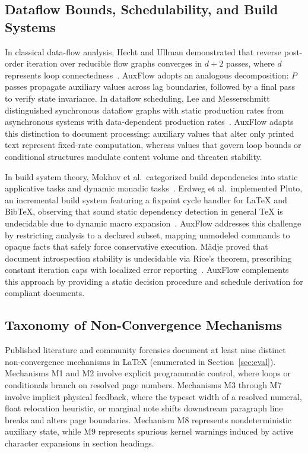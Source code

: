 \documentclass[conference]{IEEEtran}
\begin{document}
\subsection{Dataflow Bounds, Schedulability, and Build Systems}

In classical data-flow analysis, Hecht and Ullman demonstrated that reverse post-order iteration over reducible flow graphs converges in $d+2$ passes, where $d$ represents loop connectedness~\cite{hecht1975,kam1976}. AuxFlow adopts an analogous decomposition: $P$ passes propagate auxiliary values across lag boundaries, followed by a final pass to verify state invariance. In dataflow scheduling, Lee and Messerschmitt distinguished synchronous dataflow graphs with static production rates from asynchronous systems with data-dependent production rates~\cite{lee1987}. AuxFlow adapts this distinction to document processing: auxiliary values that alter only printed text represent fixed-rate computation, whereas values that govern loop bounds or conditional structures modulate content volume and threaten stability.

In build system theory, Mokhov et al.\ categorized build dependencies into static applicative tasks and dynamic monadic tasks~\cite{mokhov2018}. Erdweg et al.\ implemented Pluto, an incremental build system featuring a fixpoint cycle handler for \LaTeX{} and BibTeX, observing that sound static dependency detection in general \TeX{} is undecidable due to dynamic macro expansion~\cite{erdweg2015,erdweg2010}. AuxFlow addresses this challenge by restricting analysis to a declared subset, mapping unmodeled commands to opaque facts that safely force conservative execution. M\"adje proved that document introspection stability is undecidable via Rice's theorem, prescribing constant iteration caps with localized error reporting~\cite{madje2022}. AuxFlow complements this approach by providing a static decision procedure and schedule derivation for compliant documents.

\subsection{Taxonomy of Non-Convergence Mechanisms}

Published literature and community forensics document at least nine distinct non-convergence mechanisms in \LaTeX{} (enumerated in Section~\ref{sec:eval}). Mechanisms M1 and M2 involve explicit programmatic control, where loops or conditionals branch on resolved page numbers. Mechanisms M3 through M7 involve implicit physical feedback, where the typeset width of a resolved numeral, float relocation heuristic, or marginal note shifts downstream paragraph line breaks and alters page boundaries. Mechanism M8 represents nondeterministic auxiliary state, while M9 represents spurious kernel warnings induced by active character expansions in section headings.
\end{document}
